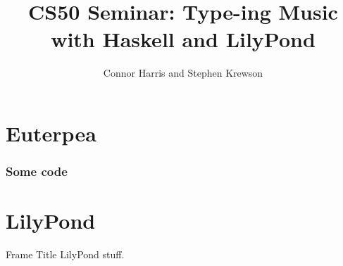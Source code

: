 \documentclass{beamer}
\title{CS50 Seminar: Type-ing Music with Haskell and LilyPond}
\author{Connor Harris and Stephen Krewson}
\begin{document}
\frame{\titlepage} 

\section{Euterpea}
\begin{frame}

\frametitle{Some code}


\end{frame}

\section{LilyPond}
\begin{frame}{Frame Title}
LilyPond stuff.
\end{frame}
\end{document}
